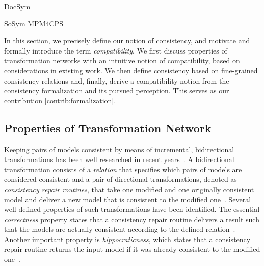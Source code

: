 \begin{copiedFrom}{DocSym}

\end{copiedFrom} %



\begin{copiedFrom}{SoSym MPM4CPS}

In this section, we precisely define our notion of consistency, and motivate and formally introduce the term \emph{compatibility}.
We first discuss properties of transformation networks %
with an intuitive notion of compatibility, based on considerations in existing work.
We then define consistency based on fine-grained consistency relations and,
finally, derive a compatibility notion from the consistency formalization and its pursued perception.
This serves as our contribution \ref{contrib:formalization}.

\subsection{Properties of Transformation Network}
\label{sec:compatibility:networkproperties}

Keeping pairs of models consistent by means of incremental, bidirectional transformations has been well researched in recent years~\cite{stevens2010sosym, etzlstorfer2013a, cleve2019dagstuhl}.
A bidirectional transformation consists of a \emph{relation} that specifies which pairs of models are considered consistent and a pair of directional transformations, denoted as \emph{consistency repair routines}, that take one modified and one originally consistent model and deliver a new model that is consistent to the modified one~\cite{stevens2010sosym}.
Several well-defined properties of such transformations have been identified.
The essential \emph{correctness} property states that a consistency repair routine delivers a result such that the models are actually consistent according to the defined relation~\cite{stevens2010sosym}.
Another important property is \emph{hippocraticness}, which states that a consistency repair routine returns the input model if it was already consistent to the modified one~\cite{stevens2010sosym}.


\end{copiedFrom}
